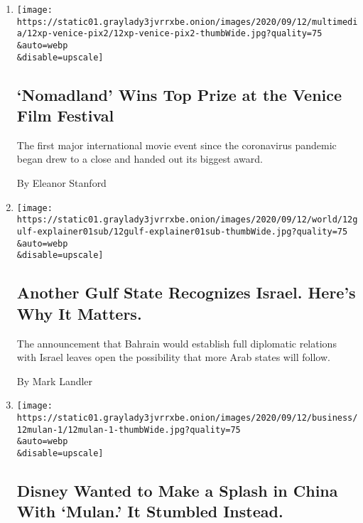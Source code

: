 \begin{enumerate}
\def\labelenumi{\arabic{enumi}.}
\item
  \href{/2020/09/12/movies/nomadland-venice-film-festival.html}{}

  \texttt{[image: https://static01.graylady3jvrrxbe.onion/images/2020/09/12/multimedia/12xp-venice-pix2/12xp-venice-pix2-thumbWide.jpg?quality=75\\\&auto=webp\\\&disable=upscale]}

  \hypertarget{nomadland-wins-top-prize-at-the-venice-film-festival}{%
  \subsection{`Nomadland' Wins Top Prize at the Venice Film
  Festival}\label{nomadland-wins-top-prize-at-the-venice-film-festival}}

  The first major international movie event since the coronavirus
  pandemic began drew to a close and handed out its biggest award.

  By Eleanor Stanford
\item
  \href{/2020/09/12/world/middleeast/bahrain-israel.html}{}

  \texttt{[image: https://static01.graylady3jvrrxbe.onion/images/2020/09/12/world/12gulf-explainer01sub/12gulf-explainer01sub-thumbWide.jpg?quality=75\\\&auto=webp\\\&disable=upscale]}

  \hypertarget{another-gulf-state-recognizes-israel-heres-why-it-matters}{%
  \subsection{Another Gulf State Recognizes Israel. Here's Why It
  Matters.}\label{another-gulf-state-recognizes-israel-heres-why-it-matters}}

  The announcement that Bahrain would establish full diplomatic
  relations with Israel leaves open the possibility that more Arab
  states will follow.

  By Mark Landler
\item
  \href{/2020/09/12/business/media/disney-mulan-china.html}{}

  \texttt{[image: https://static01.graylady3jvrrxbe.onion/images/2020/09/12/business/12mulan-1/12mulan-1-thumbWide.jpg?quality=75\\\&auto=webp\\\&disable=upscale]}

  \hypertarget{disney-wanted-to-make-a-splash-in-china-with-mulan-it-stumbled-instead}{%
  \subsection{Disney Wanted to Make a Splash in China With `Mulan.' It
  Stumbled
  Instead.}\label{disney-wanted-to-make-a-splash-in-china-with-mulan-it-stumbled-instead}}


\end{enumerate}
